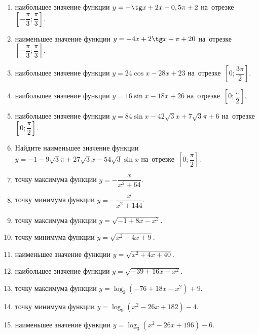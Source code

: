 \documentclass[a4paper,10pt]{article}
\begin{document}
\begin{enumerate}
\item {} наибольшее значение функции $y=-\tg x +2x-0,5\pi +2$ на~отрезке~$\left[-\dfrac{\pi}{3};\dfrac{\pi}{3}\right]$.

\item {} наименьшее значение функции $y=-4x +2\tg x+\pi+20$ на~отрезке~$\left[-\dfrac{\pi}{3};\dfrac{\pi}{3}\right]$.

\item {} наибольшее значение функции $y=24\cos x-28x+23$ на~отрезке~$\left[0;\dfrac{3\pi}{2}\right]$.

\item {} наибольшее значение функции $y=16\sin x-18x+26$ на~отрезке~$\left[0;\dfrac{\pi}{2}\right]$.

\item {} наибольшее значение функции $y=84\sin x-42\sqrt{3}x+7\sqrt{3}\pi +6$ на~отрезке~$\left[0;\dfrac{\pi}{2}\right]$.

\item Найдите наименьшее значение функции $y=-1-9\sqrt{3}\pi+27\sqrt{3}x-54\sqrt{3}\sin x$ на~отрезке~$\left[0;\dfrac{\pi}{2}\right]$.

\item {} точку максимума функции $y=-\dfrac{x}{ x^2 +64}$.

\item {} точку минимума функции $y=-\dfrac{x}{ x^2 +144}$.

\item {} точку максимума функции $y=\sqrt{-1+8x-x^2}$.

\item {} точку минимума функции $y=\sqrt{x^2-4x+9}$.

\item {} наименьшее значение функции $y=\sqrt{x^2+4x+40}$.

\item {} наибольшее значение функции $y=\sqrt{-39+16x-x^2}$.

\item {} точку максимума функции $y=\log_2\left(-76+18x-x^2\right)+9$.

\item {} точку минимума функции $y=\log_9\left(x^2-26x+182\right)-4$.

\item {} наименьшее значение функции $y=\log_3\left(x^2-26x+196\right)-6$.


\end{enumerate}
\end{document}
